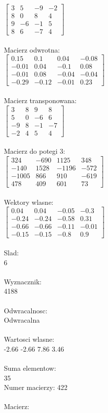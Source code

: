 \documentclass[a4paper,12pt]{article}
\begin{document}
$\begin{bmatrix} 3&5&-9&-2\\8&0&8&4\\9&-6&-1&5\\8&6&-7&4 \end{bmatrix}$
\\
\\
Macierz odwrotna:\\

$\begin{bmatrix} 0.15&0.1&0.04&-0.08\\-0.01&0.04&-0.1&0.08\\-0.01&0.08&-0.04&-0.04\\-0.29&-0.12&-0.01&0.23 \end{bmatrix}$
\\
\\
Macierz transponowana:\\

$\begin{bmatrix} 3&8&9&8\\5&0&-6&6\\-9&8&-1&-7\\-2&4&5&4 \end{bmatrix}$
\\
\\
Macierz do potegi 3:\\

$\begin{bmatrix} 324&-690&1125&348\\-140&1528&-1196&-572\\-1005&866&910&-619\\478&409&601&73 \end{bmatrix}$
\\
\\
Wektory wlasne:\\

$\begin{bmatrix} 0.04&0.04&-0.05&-0.3\\-0.24&-0.24&-0.58&0.31\\-0.66&-0.66&-0.11&-0.01\\-0.15&-0.15&-0.8&0.9 \end{bmatrix}$
\\
\\
Slad:\\
6
\\
\\
Wyznacznik:\\
4188
\\
\\
Odwracalnosc:\\
Odwracalna
\\
\\
Wartosci wlasne:\\
-2.66 -2.66 7.86 3.46
\\
\\
Suma elementow:\\
35
\\
\newpage
Numer macierzy:
422
\\
\\
Macierz:\\
\end{document}
